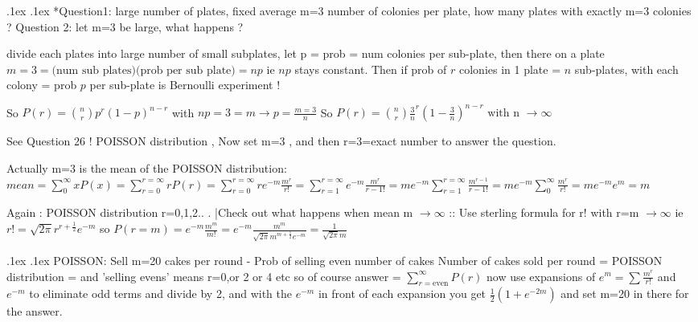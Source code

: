 \documentclass[10pt,landscape,a4paper]{article}
\makeatletter
\renewcommand{\section}{\@startsection{section}{1}{0mm}%
                                {.1ex}%
                                {.1ex}%
                                {\color{blue}\sffamily\small\bfseries}}
\renewcommand{\subsection}{\@startsection{subsection}{1}{0mm}%
                                {.1ex}%
                                {.1ex}%
                                {\sffamily\bfseries}}
\makeatother
\begin{document}
\begin{multicols*}{3}
\begin{spacing}{0.1}
\subsection*{Question1: large number of plates, fixed average m=3 number of colonies per plate, how many plates with exactly m=3 colonies ? Question 2: let m=3 be large, what happens ?}

divide each plates into large number of small subplates, let p = prob = num colonies per sub-plate, then there on a plate $m = 3 = \text{(num sub plates)}\text{(prob per sub plate)} = np$ ie $np$ stays constant. Then if prob of $r$ colonies in 1 plate = $n$ sub-plates, with each colony = prob $p$ per sub-plate is Bernoulli experiment !

So $P(r)=\binom{n}{r} p^r (1-p)^{n-r}$ with $np=3=m \rightarrow p= \frac{m=3}{n}$ So $P(r)=\binom{n}{r} \frac{3}{n}^r (1-\frac{3}{n})^{n-r} \text{ with n } \rightarrow \infty$

See Question 26 ! POISSON distribution , Now set m=3 , and then r=3=exact number to answer the question.

Actually m=3 is the mean of the POISSON  distribution: $mean = \sum_{0}^{\infty} xP(x) = \sum_{r=0}^{r=\infty} rP(r) = \sum_{r=0}^{r=\infty}  r e^{-m}\frac{m^r}{r!} = \sum_{r=1}^{r=\infty} e^{-m}\frac{m^r}{r-1!}=m e^{-m} \sum_{r=1}^{r=\infty} \frac{{m}^{r-1}}{r-1!} = m e^{-m} \sum_{0}^{\infty} \frac{{m}^{r}}{r!} = m e^{-m}e^{m}=m$

Again : POISSON distribution  r=0,1,2.. . |Check out what happens when mean m $\rightarrow \infty$ :: Use sterling formula for r! with r=m $\rightarrow \infty$ ie $r!=\sqrt{2\pi}r^{r+\frac{1}{2}}e^{-m}$ so $P(r=m)=e^{-m}\frac{m^m}{m!}=e^{-m}\frac{m^m}{\sqrt{2\pi}m^{m+\frac{1}{2}}e^{-m}}=\frac{1}{\sqrt{2\pi}m}$
	
\section{POISSON: Sell m=20 cakes per round - Prob of selling even number of cakes}
Number of cakes sold per round = POISSON distribution =  and 'selling evens' means r=0,or 2 or 4 etc so of course answer = $\sum_{r=\text{even}}^{\infty} P(r)$ now use expansions of $e^{m}=\sum \frac{m^r}{r!}$ and $e^{-m}$ to eliminate odd terms and divide by 2, and with the $e^{-m}$ in front of each expansion you get $\frac{1}{2} (1+e^{-2m})$ and set m=20 in there for the answer.


\end{spacing}
\end{multicols*}
\end{document}
